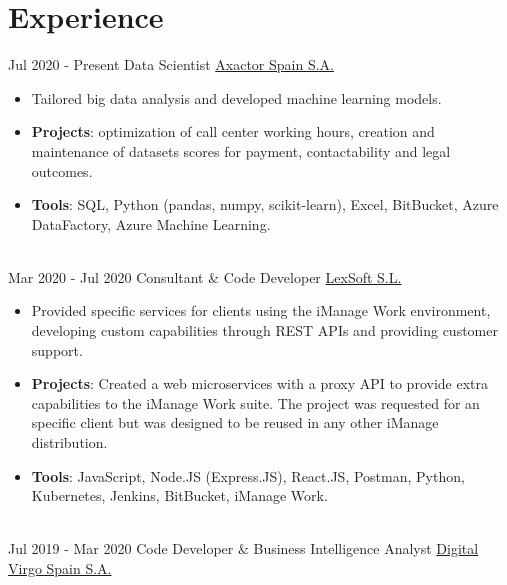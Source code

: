 \documentclass[letterpaper]{twentysecondcv} %
\begin{document}
\makeprofile %
 

\section{Experience}
\begin{twenty} %
\twentyitem
    	{Jul 2020 -}
		{Present}
        {Data Scientist}
        {\href{https://www.axactor.com/}{Axactor Spain S.A.}}
        {}
        {\begin{itemize}
        \item Tailored big data analysis and developed machine learning models.
        \item \textbf{Projects}: optimization of call center working hours, creation and maintenance of datasets scores for payment, contactability and legal outcomes.
        \item \textbf{Tools}: SQL, Python (pandas, numpy, scikit-learn), Excel, BitBucket, Azure DataFactory, Azure Machine Learning.
        \end{itemize}}
        \\
	\twentyitem
    	{Mar 2020 -}
		{Jul 2020}
        {Consultant \& Code Developer}
        {\href{www.lex-soft.com}{LexSoft S.L.}}
        {}
        {
        {\begin{itemize}
        \item Provided specific services for clients using the iManage Work environment, developing custom capabilities through REST APIs and providing customer support.
        \item \textbf{Projects}: Created a web microservices with a proxy API to provide extra capabilities to the iManage Work suite. The project was requested for an specific client but was designed to be reused in any other iManage distribution.
        \item \textbf{Tools}: JavaScript, Node.JS (Express.JS), React.JS, Postman, Python, Kubernetes, Jenkins, BitBucket, iManage Work. 
    \end{itemize}}
        }
    \\   
    \twentyitem
   		{Jul 2019 -}
		{Mar 2020}
        {Code Developer \& Business Intelligence Analyst}
        {\href{https://www.digitalvirgo.com/}{Digital Virgo Spain S.A.}}

\end{twenty}
\end{document}
